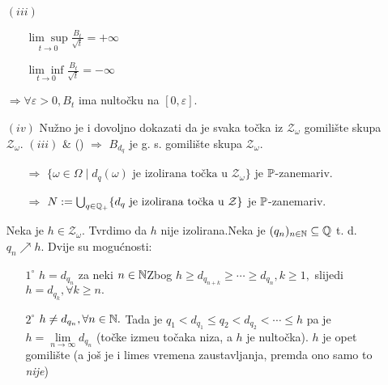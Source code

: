\documentclass{article}
\begin{document}
\begin{enumerate}
    \item[\((iii)\)]\begin{enumerate}
        \item[] \(\underset{t\to0}{\lim\sup}\frac{B_t}{\sqrt t}=+\infty\)
        \item[] \(\underset{t\to0}{\lim\inf}\frac{B_t}{\sqrt t}=-\infty\)
    \end{enumerate} \(\Rightarrow\forall\varepsilon>0, B_t\) ima nultočku na \([0,\varepsilon].\)
    \item[\((iv)\)] Nužno je i dovoljno dokazati da je svaka točka iz \(\mathcal Z_\omega\) gomilište skupa \(\mathcal Z_\omega.\) \((iii)\) \& () \(\Rightarrow\) \(B_{d_q}\) je g. s. gomilište skupa \(\mathcal Z_\omega.\) \begin{enumerate}
        \item[\(\Rightarrow\)] \(\{\omega\in\Omega\mid d_q(\omega)\text{ je izolirana točka u }\mathcal Z_\omega\}\) je \(\Bbb P\)-zanemariv.
        \item[\(\Rightarrow\)] \(N:=\bigcup_{q\in\Bbb Q_+}\{d_q\text{ je izolirana točka u }\mathcal Z\}\) je \(\Bbb P\)-zanemariv.
    \end{enumerate}
    Neka je \(h\in\mathcal Z_\omega.\) Tvrdimo da \(h\) nije izolirana.\newline Neka je \((q_n)_{n\in\Bbb N}\subseteq\Bbb Q\) t. d. \(q_n\nearrow h.\) Dvije su mogućnosti:\begin{enumerate}
        \item[\(1^\circ\)] \(h=d_{q_n}\) za neki \(n\in\Bbb N\)\newline Zbog \(h\ge d_{q_{n+k}}\ge\cdots\ge d_{q_n},k\ge 1,\) slijedi \(h=d_{q_k},\forall k\ge n.\)
        \item[\(2^\circ\)] \(h\ne d_{q_n},\forall n\in\Bbb N.\) Tada je \(q_1<d_{q_1}\le q_2<d_{q_2}<\cdots\le h\) pa je \(h=\lim\limits_{n\to\infty}d_{q_n}\) (točke izme\dj{}u točaka niza, a \(h\) je nultočka). \(h\) je opet gomilište (a još je i limes vremena zaustavljanja, premda ono samo to \emph{nije})
    \end{enumerate}
\end{enumerate}
\newpage
\end{document}
